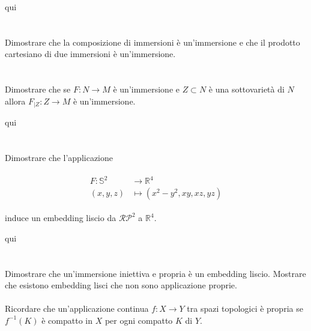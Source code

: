 qui

\tocless\section{}\label{es2-21}

\begin{tcolorbox}
	Dimostrare che la composizione di immersioni è un’immersione e che il prodotto cartesiano di due immersioni è un’immersione.
\end{tcolorbox}



\tocless\section{}\label{es2-22}

\begin{tcolorbox}
	Dimostrare che se $ F : N \to M $ è un'immersione e $ Z \subset N $ è una sottovarietà di $ N $ allora $ F_{|Z} : Z \to M $ è un'immersione.
\end{tcolorbox}

qui

\tocless\section{}\label{es2-23}

\begin{tcolorbox}
	Dimostrare che l'applicazione
	
	\begin{align}
		\begin{split}
			F : \mathbb{S}^{2} &\to \mathbb{R}^{4}\\
			(x,y,z) &\mapsto (x^{2}-y^{2},xy,xz,yz)
		\end{split}
	\end{align}
	
	induce un embedding liscio da $ \mathcal{RP}^{2} $ a $ \mathbb{R}^{4} $.
\end{tcolorbox}

qui

\tocless\section{}\label{es2-24}

\begin{tcolorbox}
	Dimostrare che un'immersione iniettiva e propria è un embedding liscio. Mostrare che esistono embedding lisci che non sono applicazione proprie.\\\\
	Ricordare che un'applicazione continua $ f : X \to Y $ tra spazi topologici è propria se $ f^{-1}(K) $ è compatto in $ X $ per ogni compatto $ K $ di $ Y $.
\end{tcolorbox}


